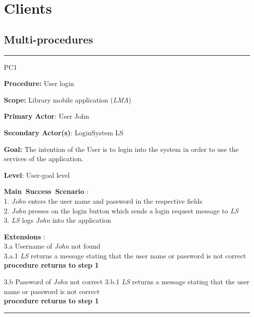 \section{Clients}
\label{chap:usage_guide}

\subsection{Multi-procedures}

\vspace{0.5cm}
\hrule
\begin{lyxlist}{PC1}
\small{
\item [\textbf{Procedure:}] User login
\item [\textbf{Scope:}] Library mobile application (\emph{LMA})
\item [\textbf{Primary Actor}:] User John
\item [\textbf{Secondary Actor(s)}:] LoginSystem LS
\item [\textbf{Goal:}] The intention of the User is to login into the system in
order to use the services of the application.
\item [\textbf{Level}:] User-goal level
\item [\textbf{Main~Success~Scenario}]:\\
1. \emph{John} enters the user name and password in the respective fields\\
2. \emph{John} presses on the login button which sends a login request message
to \emph{LS}\\
3. \emph{LS} logs \emph{John} into the application\\


\item [\textbf{Extensions}]:\\
3.a Username of \emph{John} not found\\
\hspace*{0.5cm} 3.a.1 \emph{LS} returns a message stating that the user name
or password is not correct\\
\hspace*{0.5cm} \textbf{procedure returns to step 1}

3.b Password of \emph{John} not correct
\hspace*{0.5cm} 3.b.1 \emph{LS} returns a message stating that the user name
or password is not correct\\
\hspace*{0.5cm} \textbf{procedure returns to step 1}

}

\end{lyxlist}
\hrule

